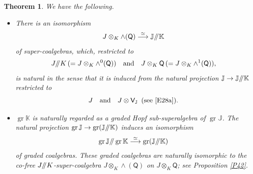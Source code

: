 \documentclass[11pt, a4paper]{amsart}
\newtheorem{theorem}{Theorem}[section]
\theoremstyle{definition}
\numberwithin{equation}{section}
\begin{document}
\begin{theorem}\label{T41}
We have the following.
\begin{itemize}
\item[(1)] There is an isomorphism
\[ J \otimes_{K} \wedge(\mathsf{Q}) \overset{\simeq}{\longrightarrow} \mathbb{J}/\hspace{-1mm}/\mathbb{K} \]
of super-coalgebras, which, restricted to
\[ J/\hspace{-1mm}/K\, (= J \otimes_{K} \wedge^{0}(\mathsf{Q}))\quad \text{and}\quad J \otimes_{K} \mathsf{Q}\, (= J \otimes_{K} \wedge^{1}(\mathsf{Q})), \]
is natural in the sense that it is induced from the natural projection $\mathbb{J} \to \mathbb{J}/\hspace{-1mm}/\mathbb{K}$ restricted to
\[ J\quad \text{and}\quad J \otimes \mathsf{V}_{\mathbb{J}}\ \, (\text{see \eqref{E28a}}). \]
\item[(2)] $\operatorname{gr}\mathbb{K}$ is naturally regarded as a graded Hopf sub-superalgebra of $\operatorname{gr}\mathbb{J}$.
The natural projection $\operatorname{gr}\mathbb{J} \to \operatorname{gr}(\mathbb{J}/\hspace{-1mm}/\mathbb{K})$ induces an isomorphism
\begin{equation}\label{E46}
\operatorname{gr}\mathbb{J}/\hspace{-1mm}/\operatorname{gr}\mathbb{K} \overset{\simeq}{\longrightarrow} \operatorname{gr}(\mathbb{J}/\hspace{-1mm}/\mathbb{K})
\end{equation}
of graded coalgebras.
These graded coalgebras are naturally isomorphic to the co-free $J/\hspace{-1mm}/K$-super-coalgebra 
$J \otimes_{K} \wedge(\mathsf{Q})$ on $J \otimes_{K} \mathsf{Q}$; see Proposition \ref{P42}.
\end{itemize}
\end{theorem}
\end{document}
